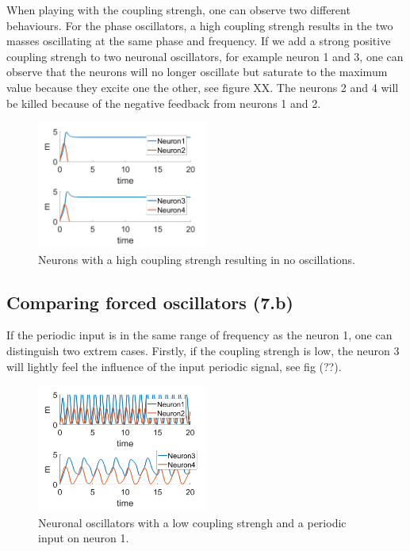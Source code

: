 \documentclass[a4paper]{scrartcl}
\begin{document}
When playing with the coupling strengh, one can observe two different behaviours. For the phase oscillators, a high coupling strengh results in the two masses oscillating at the same phase and frequency. If we add a strong positive coupling strengh to two neuronal oscillators, for example neuron 1 and 3, one can observe that the neurons will no longer oscillate but saturate to the maximum value because they excite one the other, see figure XX. The neurons 2 and 4 will be killed because of the negative feedback from neurons 1 and 2.

\begin{figure}[!h]
	\centering
	\includegraphics[width=0.5\textwidth]{fig/kill.png}
	\caption{Neurons with a high coupling strengh resulting in no oscillations.}
\end{figure}

\newpage

\subsection{Comparing forced oscillators (7.b)}

If the periodic input is in the same range of frequency as the neuron 1, one can distinguish two extrem cases. Firstly, if the coupling strengh is low, the neuron 3 will lightly feel the influence of the input periodic signal, see fig (??).

\begin{figure}[!h]
	\centering
	\includegraphics[width=0.5\textwidth]{fig/7b.png}
	\caption{Neuronal oscillators with a low coupling strengh and a periodic input on neuron 1.}
\end{figure}
\end{document}
